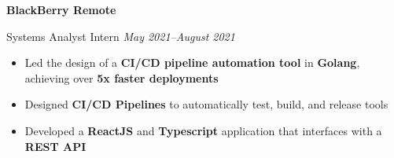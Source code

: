 \textbf{BlackBerry \hfill Remote}

Systems Analyst Intern \hfill \textit{May 2021--August 2021}
\begin{itemize}
    \item Led the design of a \textbf{CI\slash CD pipeline automation tool} in \textbf{Golang}, achieving over \textbf{5x faster deployments}
    \item Designed \textbf{CI\slash CD Pipelines} to automatically test, build, and release tools
    \item Developed a \textbf{ReactJS} and \textbf{Typescript} application that interfaces with a \textbf{REST API}
\end{itemize}
